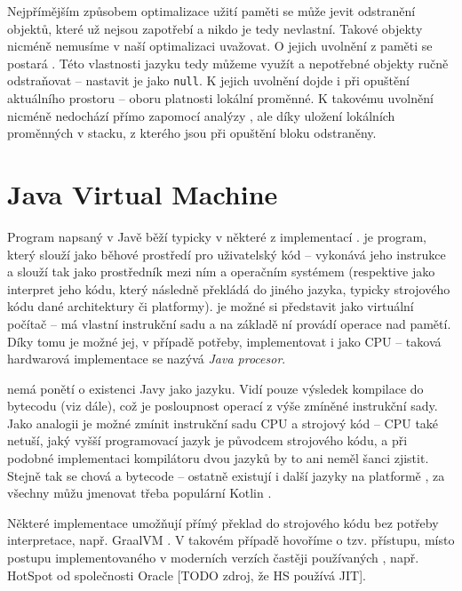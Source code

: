 Nejpřímějším způsobem optimalizace užití paměti se může jevit odstranění objektů, které už nejsou zapotřebí a nikdo je tedy nevlastní. Takové objekty nicméně nemusíme v naší optimalizaci uvažovat. O jejich uvolnění z paměti se postará . Této vlastnosti jazyku tedy můžeme využít a nepotřebné objekty ručně odstraňovat -- nastavit je jako \texttt{null}. K jejich uvolnění dojde i při opuštění aktuálního prostoru -- oboru platnosti lokální proměnné. K takovému uvolnění nicméně nedochází přímo zapomocí analýzy , ale díky uložení lokálních proměnných v stacku, z kterého jsou při opuštění bloku odstraněny.






\chapter{Java Virtual Machine}
Program napsaný v Javě běží typicky v některé z implementací .  je program, který slouží jako běhové prostředí pro uživatelský kód -- vykonává jeho instrukce a slouží tak jako prostředník mezi ním a operačním systémem (respektive jako interpret jeho kódu, který následně překládá do jiného jazyka, typicky strojového kódu dané architektury či platformy).  je možné si představit jako virtuální počítač -- má vlastní instrukční sadu a na základě ní provádí operace nad pamětí. Díky tomu je možné jej, v případě potřeby, implementovat i jako CPU -- taková hardwarová implementace se nazývá \textit{Java procesor}. 

 nemá ponětí o existenci Javy jako jazyku. Vidí pouze výsledek kompilace do bytecodu (viz dále), což je posloupnost operací z výše zmíněné instrukční sady. Jako analogii je možné zmínit instrukční sadu CPU a strojový kód -- CPU také netuší, jaký vyšší programovací jazyk je původcem strojového kódu, a při podobné implementaci kompilátoru dvou jazyků by to ani neměl šanci zjistit. Stejně tak se chová  a bytecode -- ostatně existují i další jazyky na platformě , za všechny můžu jmenovat třeba populární Kotlin \cite{jvms-jvm}.

Některé implementace  umožňují přímý překlad do strojového kódu bez potřeby interpretace, např. GraalVM \cite{graalvm}. V takovém případě hovoříme o tzv.  přístupu, místo  postupu implementovaného v moderních verzích častěji používaných , např. HotSpot od společnosti Oracle [TODO zdroj, že HS používá JIT].

